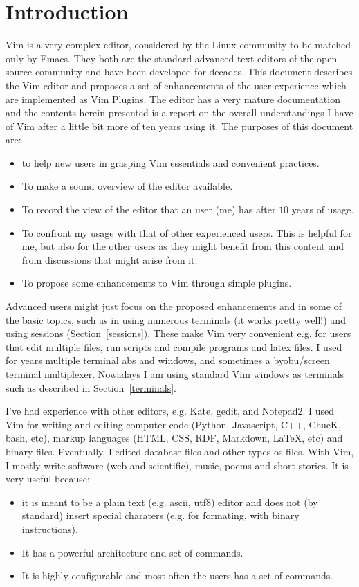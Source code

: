 \documentclass{article}
\begin{document}
\section{Introduction}
Vim is a very complex editor,
considered by the Linux community to be
matched only by Emacs.
They both are the standard advanced text editors
of the open source community
and have been developed for decades.
This document describes the Vim editor
and proposes a set of enhancements of the user
experience which
are implemented as Vim Plugins.
The editor has a very mature documentation
and the contents herein presented is a
report on the overall understandings I
have of Vim after a little bit more
of ten years using it.
The purposes of this document are:
\begin{itemize}
  \item to help new users in grasping Vim essentials
  and convenient practices.
  \item To make a sound overview of the editor available.
  \item To record the view of the editor that
  an user (me) has after $10$ years of usage.
  \item To confront my usage with that of other experienced
  users. This is helpful for me, but also for the other users
  as they might benefit from this content and from discussions
  that might arise from it.
  \item To propose some enhancements to Vim through simple plugins.
\end{itemize}

Advanced users might just focus on the proposed enhancements and
in some of the basic topics, such as in using numerous terminals 
(it works pretty well!) and using sessions (Section~\ref{sessions}).
These make Vim very convenient e.g. for users that edit multiple files,
run scripts and compile programs and latex files.
I used for years multiple terminal abs and windows,
and sometimes a byobu/screen terminal multiplexer.
Nowadays I am using standard Vim windows as terminals
such as described in Section~\ref{terminals}.

I've had experience with other editors, e.g. Kate, gedit, and Notepad2.
I used Vim for writing and editing computer code (Python, Javascript, C++, ChucK, bash, etc), markup languages (HTML, CSS, RDF, Markdown, \LaTeX, etc) and binary files.
Eventually, I edited database files and other types os files.
With Vim, I mostly write software (web and scientific),
music, poems and short stories.
It is very useful because:
\begin{itemize}
  \item it is meant to be a plain text (e.g. ascii, utf8) editor
  and does not (by standard) insert special charaters (e.g. for formating, with binary instructions).
  \item It has a powerful architecture and set of commands.
  \item It is highly configurable and most often the users
  has a set of commands.
\end{itemize}
\end{document}
